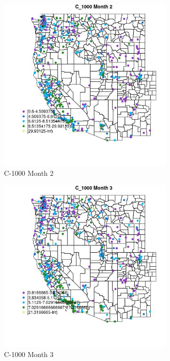 \begin{figure} 
\centering  
\includegraphics[width=0.77\textwidth]{Code_Outputs/ML_input_report_ML_input_PM25_Step5_part_d_de_duplicated_aves_ML_input_MapObsMo2C_1000.jpg} 
\caption{\label{fig:ML_input_report_ML_input_PM25_Step5_part_d_de_duplicated_aves_ML_inputMapObsMo2C_1000}C-1000 Month 2} 
\end{figure} 
 

\begin{figure} 
\centering  
\includegraphics[width=0.77\textwidth]{Code_Outputs/ML_input_report_ML_input_PM25_Step5_part_d_de_duplicated_aves_ML_input_MapObsMo3C_1000.jpg} 
\caption{\label{fig:ML_input_report_ML_input_PM25_Step5_part_d_de_duplicated_aves_ML_inputMapObsMo3C_1000}C-1000 Month 3} 
\end{figure} 
 

